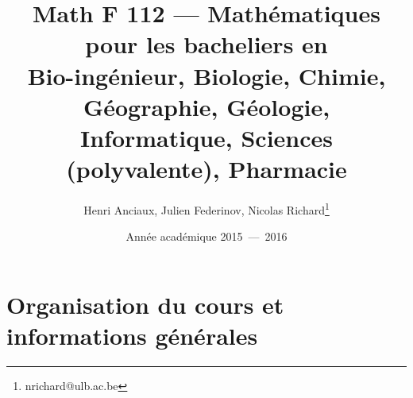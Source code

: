 \documentclass[french,xcolor=svgnames]{beamer}
\title[Math F 112]{Math F 112 \texorpdfstring{---}{} Mathématiques\\
pour les bacheliers en\\
Bio-ingénieur, Biologie, Chimie, Géographie, Géologie, Informatique, Sciences (polyvalente), Pharmacie}
\author{Henri Anciaux, Julien Federinov, Nicolas Richard\thanks{nrichard@ulb.ac.be}}
\date{Année académique 2015~---~2016}
\begin{document}





\begin{frame}
  \maketitle
\end{frame}
\section{Organisation du cours et informations générales}

\end{document}
